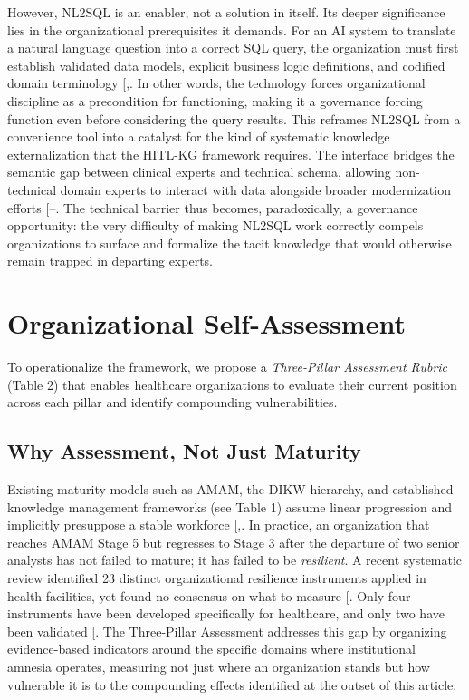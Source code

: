 \documentclass[
  american,
  11pt,
  letterpaper,
  oneside  ,captions=tableheading
]{scrartcl}
\begin{document}
However, NL2SQL is an enabler, not a solution in itself. Its deeper
significance lies in the organizational prerequisites it demands. For an
AI system to translate a natural language question into a correct SQL
query, the organization must first establish validated data models,
explicit business logic definitions, and codified domain terminology
{[},\citeproc{ref-zhang2024}{3}{]}. In other
words, the technology forces organizational discipline as a precondition
for functioning, making it a governance forcing function even before
considering the query results. This reframes NL2SQL from a convenience
tool into a catalyst for the kind of systematic knowledge
externalization that the HITL-KG framework requires. The interface
bridges the semantic gap between clinical experts and technical schema,
allowing non-technical domain experts to interact with data alongside
broader modernization efforts
{[}--\citeproc{ref-arora2025}{66}{]}.
The technical barrier thus becomes, paradoxically, a governance
opportunity: the very difficulty of making NL2SQL work correctly compels
organizations to surface and formalize the tacit knowledge that would
otherwise remain trapped in departing experts.

\section{Organizational
Self-Assessment}\label{organizational-self-assessment}

To operationalize the framework, we propose a \emph{Three-Pillar
Assessment Rubric} (Table 2) that enables healthcare organizations to
evaluate their current position across each pillar and identify
compounding vulnerabilities.

\subsection{Why Assessment, Not Just
Maturity}\label{why-assessment-not-just-maturity}

Existing maturity models such as AMAM, the DIKW hierarchy, and
established knowledge management frameworks (see Table 1) assume linear
progression and implicitly presuppose a stable workforce
{[},\citeproc{ref-wang2018}{9}{]}. In
practice, an organization that reaches AMAM Stage 5 but regresses to
Stage 3 after the departure of two senior analysts has not failed to
mature; it has failed to be \emph{resilient}. A recent systematic review
identified 23 distinct organizational resilience instruments applied in
health facilities, yet found no consensus on what to measure
{[}\citeproc{ref-ignatowicz2023}{67}{]}. Only four instruments have been
developed specifically for healthcare, and only two have been validated
{[}\citeproc{ref-ratliff2025}{68}{]}. The Three-Pillar Assessment
addresses this gap by organizing evidence-based indicators around the
specific domains where institutional amnesia operates, measuring not
just where an organization stands but how vulnerable it is to the
compounding effects identified at the outset of this article.
\end{document}
